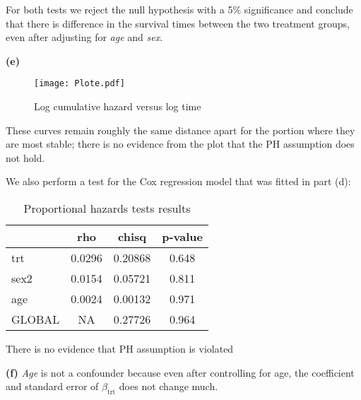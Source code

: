 \documentclass[11pt,a4paper]{article}
\begin{document}
For both tests we reject the null hypothesis with a 5\% significance and conclude that there is difference in the survival times between the two treatment groups, even after adjusting for \emph{age} and \emph{sex}.

\noindent
\textbf{(e)} 

\begin{figure}[H]
\centering
\texttt{[image: Plote.pdf]}
\vspace{-0.5cm}
\caption{Log cumulative hazard versus log time}
\end{figure}
These curves remain roughly the same distance apart for the portion where they are most stable; there is no evidence from the plot that the PH assumption does not hold.

We also perform a test for the Cox regression model that was fitted in part (d):
\begin{table}[H]
\centering
\begin{tabular}{lccc}
  \hline
& rho & chisq & p-value \\
\hline
trt             &0.0296 &0.20868 &0.648\\
sex2 &0.0154 &0.05721 &0.811\\
age             &0.0024 &0.00132 &0.971\\
GLOBAL          &    NA &0.27726 &0.964\\
   \hline
\end{tabular}
\caption{Proportional hazards tests results}
\end{table}
There is no evidence that PH assumption is violated

\noindent
\textbf{(f)} 
{\emph{Age}} is not a confounder because even after controlling for age, the coefficient and standard error of $\beta_{\text{trt}}$ does not change much.
\end{document}
